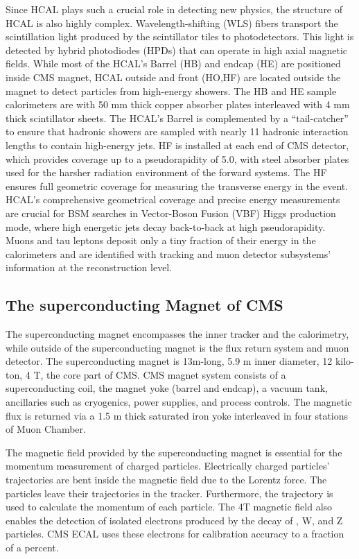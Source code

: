 Since HCAL plays such a crucial role in detecting new physics, the structure of HCAL is also highly complex.
Wavelength-shifting (WLS) fibers transport the scintillation light produced by the scintillator tiles to photodetectors.
This light is detected by hybrid photodiodes (HPDs) that can operate in high axial magnetic fields.
While most of the HCAL's Barrel (HB) and endcap (HE) are positioned inside CMS magnet, HCAL outside and front (HO,HF) are located outside the magnet to detect particles from high-energy showers.
The HB and HE sample calorimeters are with 50 mm
thick copper absorber plates interleaved with 4 mm thick scintillator sheets.
The HCAL's Barrel is complemented by a ``tail-catcher'' to ensure that hadronic showers are sampled with nearly 11 hadronic interaction lengths to contain high-energy jets.
HF is installed at each end of CMS detector, which provides coverage up to a pseudorapidity of 5.0, with steel absorber plates used for the harsher radiation environment of the forward systems.
The HF ensures full geometric coverage for measuring the transverse energy in the event.
HCAL's comprehensive geometrical coverage and precise energy measurements are crucial for BSM searches in Vector-Boson Fusion (VBF) Higgs production mode, where high energetic jets decay back-to-back at high pseudorapidity.
Muons and tau leptons deposit only a tiny fraction of their energy in the calorimeters and are identified with tracking and muon detector subsystems' information at the reconstruction level.

\subsection{The superconducting Magnet  of CMS}
The superconducting magnet encompasses the inner tracker and the calorimetry, while outside of the superconducting magnet is the flux return system and muon detector.
The superconducting magnet is 13m-long, 5.9 m inner diameter, 12 kilo-ton, 4 T, the core part of CMS.
CMS magnet system consists of a superconducting coil, the magnet yoke (barrel and endcap), a vacuum tank, ancillaries such as cryogenics, power supplies, and process controls.
The magnetic flux is returned via a 1.5 m thick saturated iron yoke interleaved in four stations of Muon Chamber.

The magnetic field provided by the superconducting magnet is essential for the momentum measurement of charged particles.
Electrically charged particles' trajectories are bent inside the magnetic field due to the Lorentz force.
The particles leave their trajectories in the tracker. 
Furthermore, the trajectory is used to calculate the momentum of each particle.
The 4T magnetic field also enables the detection of isolated electrons produced by the decay of \PQb, W, and Z particles.
CMS ECAL uses these electrons for calibration accuracy to a fraction of a percent.
